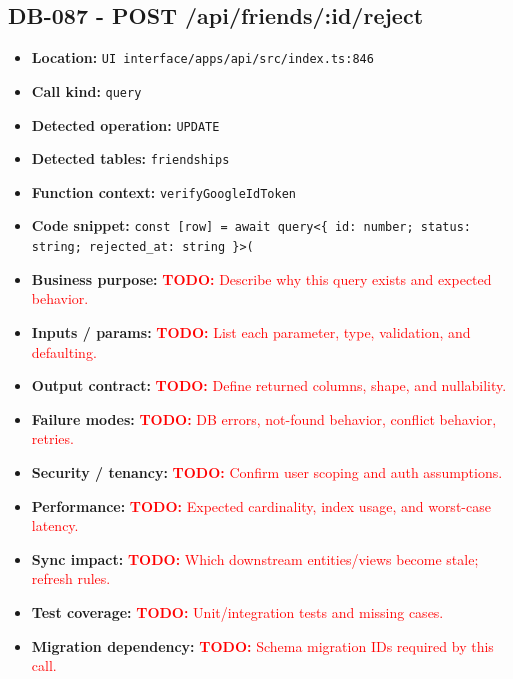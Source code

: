 \documentclass[11pt]{article}
\newcommand{\todoitem}[1]{\textcolor{red}{\textbf{TODO:} #1}}
\begin{document}
\subsection{DB-087 - POST /api/friends/:id/reject}
\begin{itemize}[leftmargin=1.5em]
\item \textbf{Location:} \texttt{UI interface/apps/api/src/index.ts:846}
\item \textbf{Call kind:} \texttt{query}
\item \textbf{Detected operation:} \texttt{UPDATE}
\item \textbf{Detected tables:} \texttt{friendships}
\item \textbf{Function context:} \texttt{verifyGoogleIdToken}
\item \textbf{Code snippet:} \texttt{const [row] = await query<\{ id: number; status: string; rejected\_at: string \}>(}
\item \textbf{Business purpose:} \todoitem{Describe why this query exists and expected behavior.}
\item \textbf{Inputs / params:} \todoitem{List each parameter, type, validation, and defaulting.}
\item \textbf{Output contract:} \todoitem{Define returned columns, shape, and nullability.}
\item \textbf{Failure modes:} \todoitem{DB errors, not-found behavior, conflict behavior, retries.}
\item \textbf{Security / tenancy:} \todoitem{Confirm user scoping and auth assumptions.}
\item \textbf{Performance:} \todoitem{Expected cardinality, index usage, and worst-case latency.}
\item \textbf{Sync impact:} \todoitem{Which downstream entities/views become stale; refresh rules.}
\item \textbf{Test coverage:} \todoitem{Unit/integration tests and missing cases.}
\item \textbf{Migration dependency:} \todoitem{Schema migration IDs required by this call.}
\end{itemize}
\end{document}
